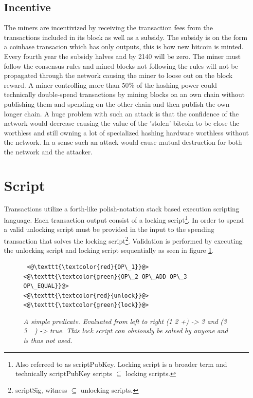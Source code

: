 \subsection{Incentive}

The miners are incentivized by receiving the transaction fees from the transactions included in its block as well as a subsidy. The subsidy is on the form a coinbase transacion which has only outputs, this is how new bitcoin is minted. Every fourth year the subsidy halves and by 2140 will be zero. The miner must follow the consensus rules and mined blocks not following the rules will not be propagated through the network causing the miner to loose out on the block reward. A miner controlling more than 50\% of the hashing power could technically double-spend transactions by mining blocks on an own chain without publishing them and spending on the other chain and then publish the own longer chain. A huge problem with such an attack is that the confidence of the network would decrease causing the value of the 'stolen' bitcoin to be close the worthless and still owning a lot of specialized hashing hardware worthless without the network. In a sense such an attack would cause mutual destruction for both the network and the attacker. 

\section{Script}

Transactions utilize a forth-like polish-notation stack based execution scripting language\cite{antonopoulos:mastering:bitcoin}. Each transaction output consist of a locking script\footnote{Also refereed to as scriptPubKey. Locking script is a broader term and technically scriptPubKey scripts $ \subseteq $ locking scripts.}. In order to spend a valid unlocking script must be provided in the input to the spending transaction that solves the locking script\footnote{scriptSig, witness $\subseteq $ unlocking scripts.}. Validation is performed by executing the unlocking script and locking script sequentially as seen in figure \ref{fig:simple:script}. 

\begin{figure}[!hbt]
	
	\begin{lstlisting}
 <@\texttt{\textcolor{red}{OP\_1}}@>   <@\texttt{\textcolor{green}{OP\_2 OP\_ADD OP\_3 OP\_EQUAL}}@>
<@\texttt{\textcolor{red}{unlock}}@>           <@\texttt{\textcolor{green}{lock}}@>
	\end{lstlisting}
	
	\caption{\textit{ A simple predicate. Evaluated from left to right (1 2 +) -> 3 and
			(3 3 =) -> true. This lock script can obviously be solved by anyone and is thus not used.
	}}
	\label{fig:simple:script}
\end{figure}

